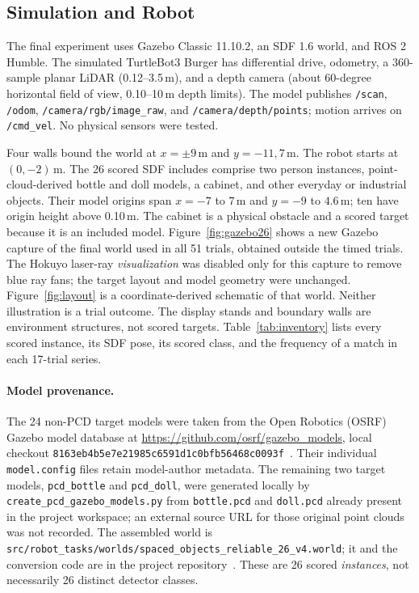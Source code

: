 \documentclass[conference]{IEEEtran}
\begin{document}
\subsection{Simulation and Robot}
The final experiment uses Gazebo Classic 11.10.2, an SDF 1.6 world, and ROS 2 Humble. The simulated TurtleBot3 Burger has differential drive, odometry, a 360-sample planar LiDAR (0.12--3.5\,m), and a depth camera (about 60-degree horizontal field of view, 0.10--10\,m depth limits). The model publishes \texttt{/scan}, \texttt{/odom}, \texttt{/camera/rgb/image\_raw}, and \texttt{/camera/depth/points}; motion arrives on \texttt{/cmd\_vel}. No physical sensors were tested.

Four walls bound the world at $x=\pm9$\,m and $y=-11,7$\,m. The robot starts at $(0,-2)$\,m. The 26 scored SDF includes comprise two person instances, point-cloud-derived bottle and doll models, a cabinet, and other everyday or industrial objects. Their model origins span $x=-7$ to $7$\,m and $y=-9$ to $4.6$\,m; ten have origin height above 0.10\,m. The cabinet is a physical obstacle and a scored target because it is an included model. Figure~\ref{fig:gazebo26} shows a new Gazebo capture of the final world used in all 51 trials, obtained outside the timed trials. The Hokuyo laser-ray \emph{visualization} was disabled only for this capture to remove blue ray fans; the target layout and model geometry were unchanged. Figure~\ref{fig:layout} is a coordinate-derived schematic of that world. Neither illustration is a trial outcome. The display stands and boundary walls are environment structures, not scored targets. Table~\ref{tab:inventory} lists every scored instance, its SDF pose, its scored class, and the frequency of a match in each 17-trial series.

\paragraph{Model provenance.} The 24 non-PCD target models were taken from the Open Robotics (OSRF) Gazebo model database at \url{https://github.com/osrf/gazebo_models}, local checkout \texttt{8163eb4b5e7e21985c6591d1c0bfb56468c0093f}~\cite{osrfmodels}. Their individual \texttt{model.config} files retain model-author metadata. The remaining two target models, \texttt{pcd\_bottle} and \texttt{pcd\_doll}, were generated locally by \texttt{create\_pcd\_gazebo\_models.py} from \texttt{bottle.pcd} and \texttt{doll.pcd} already present in the project workspace; an external source URL for those original point clouds was not recorded. The assembled world is \texttt{src/robot\_tasks/worlds/spaced\_objects\_reliable\_26\_v4.world}; it and the conversion code are in the project repository~\cite{projectrepo}. These are 26 scored \emph{instances}, not necessarily 26 distinct detector classes.
\end{document}
